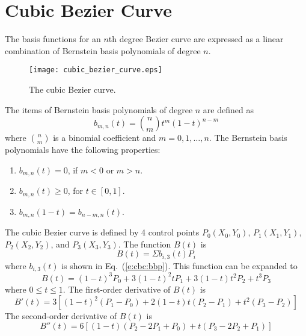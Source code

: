 \documentclass{turgon}
\begin{document}
\chapter{Cubic Bezier Curve}


The basis functions for an $n$th degree Bezier curve are expressed as a linear
combination of Bernstein basis polynomials of degree $n$.

\begin{figure}[htbp]
    \centering
    \texttt{[image: cubic\_bezier\_curve.eps]}
    \caption{The cubic Bezier curve.}
    \label{f:cubic_bezier_curve}
\end{figure}

The items of Bernstein basis polynomials of degree $n$ are defined as
\begin{equation}
    b_{m, n}(t) = {n \choose m} t^m (1 - t)^{n - m}
    \label{e:cbc:bbp}
\end{equation}
where ${n \choose m}$ is a binomial coefficient and $m=0,1, \dots ,n$. The
Bernstein basis polynomials have the following properties:
\begin{enumerate}
    \item
    $b_{m, n}(t) = 0$, if $m < 0$ or $m > n$.
    \item
    $b_{m, n}(t) \geq 0$, for $t \in [0, 1]$.
    \item
    $b_{m, n}(1 - t) = b_{n - m, n}(t)$.
\end{enumerate}
The cubic Bezier curve is defined by 4 control points $P_0(X_0, Y_0)$,
$P_1(X_1, Y_1)$, $P_2(X_2, Y_2)$, and $P_3(X_3, Y_3)$.  The function $B(t)$ is
\begin{equation*}
    B(t) = \Sigma b_{i,3}(t)P_i
\end{equation*}
where $b_{i,3}(t)$ is shown in Eq.~(\ref{e:cbc:bbp}). This function can be
expanded to
\begin{equation}
    B(t) = (1-t)^3 P_0 + 3(1-t)^2 t P_1 + 3(1-t) t^2 P_2 + t^3 P_3
    \label{e:cbc:der0}
\end{equation}
where $0 \leq t \leq 1$.  The first-order derivative of $B(t)$ is
\begin{equation*}
    B'(t) = 3\left[
      (1-t)^2 (P_1 - P_0) + 2(1-t)t(P_2 - P_1) + t^2(P_3 - P_2)
    \right]
\end{equation*}
The second-order derivative of $B(t)$ is
\begin{equation*}
    B''(t) = 6\left[(1-t)(P_2 - 2P_1 + P_0) + t(P_3 - 2P_2 + P_1)\right]
\end{equation*}
\end{document}
